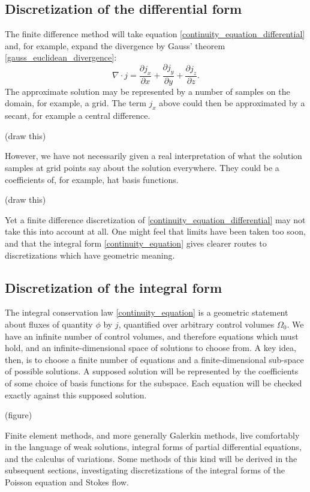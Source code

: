 \documentclass[11pt,a4paper]{memoir}
\newcommand{\Part}[2]{\frac{\partial #1}{\partial #2}}
\begin{document}
\subsection{Discretization of the differential form}
The finite difference method will take equation \eqref{continuity_equation_differential} and, for example, expand the divergence by Gauss' theorem
\eqref{gauss_euclidean_divergence}:
$$
    \nabla \cdot j = \Part{j_x}{x} + \Part{j_y}{y} + \Part{j_z}{z}.
$$
The approximate solution may be represented by a number of samples on the domain, for example, a grid. The term
$j_x$ above could then be approximated by a secant, for example a central difference.

\vskip 0.2in
(draw this)
\vskip 0.2in

However, we have not necessarily given a real interpretation of what the solution samples at grid points say about the solution everywhere.
They could be a coefficients of, for example, hat basis functions.

\vskip 0.2in
(draw this)
\vskip 0.2in

Yet a finite difference discretization of \eqref{continuity_equation_differential} may not take this into account at all. One might feel that
limits have been taken too soon, and that the integral form \eqref{continuity_equation} gives clearer routes to discretizations which
have geometric meaning.

\subsection{Discretization of the integral form}
The integral conservation law \eqref{continuity_equation} is a geometric statement about fluxes
of quantity $\phi$ by $j$, quantified over arbitrary control volumes $\Omega_0$.
We have an infinite number of control volumes, and therefore equations which must hold, and an infinite-dimensional
space of solutions to choose from. A key idea, then, is to choose a finite number of equations and a finite-dimensional sub-space of possible solutions.
A supposed solution will be represented by the coefficients of some choice of basis functions for the subspace. Each equation will be checked exactly against this supposed solution.

\vskip 0.2in
(figure)
\vskip 0.2in

Finite element methods, and more generally Galerkin methods, live comfortably in the language of weak solutions, integral forms of partial differential equations,
and the calculus of variations. Some methods of this kind will be derived in the subsequent sections, investigating discretizations of the integral forms
of the Poisson equation and Stokes flow.
\end{document}
